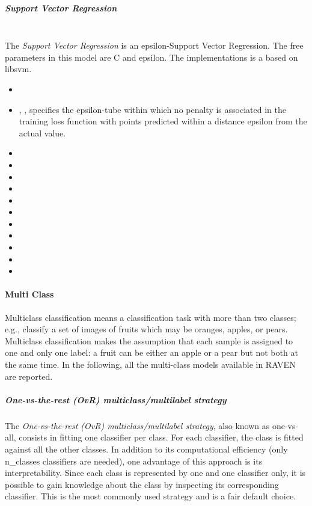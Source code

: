 \subparagraph{Support Vector Regression}
\mbox{}
\\The \textit{Support Vector Regression} is an epsilon-Support Vector
Regression.
%
The free parameters in this model are C and epsilon.
%
The implementations is a based on libsvm.
%
\begin{itemize}
  \item {}
  \item {}, , specifies the
  epsilon-tube within which no penalty is associated in the training loss
  function with points predicted within a distance epsilon from the actual
  value.
  \item {}
  \item {}
  \item {}
  \item {}
  \item {}
  \item {}
  \item \tolSVMDescription{}
  \item \cacheSizeDescription{}
  \item {}
  \item {}
  \item {}
\end{itemize}
\paragraph{Multi Class}
\label{Multiclass}
Multiclass classification means a classification task with more than two
classes; e.g., classify a set of images of fruits which may be oranges, apples,
or pears.
%
Multiclass classification makes the assumption that each sample is assigned to
one and only one label: a fruit can be either an apple or a pear but not both at
the same time.
%
In the following, all the multi-class models available in RAVEN are reported.
%
\subparagraph{One-vs-the-rest (OvR) multiclass/multilabel strategy}
\mbox{}

The \textit{One-vs-the-rest (OvR) multiclass/multilabel strategy}, also known
as one-vs-all, consists in fitting one classifier per class.
%
For each classifier, the class is fitted against all the other classes.
%
In addition to its computational efficiency (only n\_classes classifiers are
needed), one advantage of this approach is its interpretability.
%
Since each class is represented by one and one classifier only, it is possible
to gain knowledge about the class by inspecting its corresponding classifier.
%
This is the most commonly used strategy and is a fair default choice.

